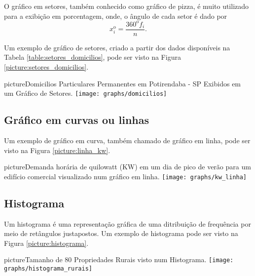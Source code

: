 \documentclass[11pt,fleqn]{book}
\numberwithin{mpicture}{chapter}
\numberwithin{mtable}{chapter}
\numberwithin{mframe}{chapter}
\begin{document}
O gráfico em setores, também conhecido como gráfico de pizza, é muito utilizado para a exibição em porcentagem, onde, o ângulo de cada setor é dado por
\[
	x_i^{\text{o}}=\frac{360^{\text{o}}f_i}{n}\text{.}
\]

Um exemplo de gráfico de setores, criado a partir dos dados disponíveis na Tabela \ref{table:setores_domicilios}, pode ser visto na Figura \ref{picture:setores_domicilios}.

\vspace{160pt}

\begin{pageWidthArea}
	\begin{pageWidthAreaPicture}{picture}{Domicilios Particulares Permanentes em Potirendaba - SP Exibidos em um Gráfico de Setores.}
		\label{picture:setores_domicilios}
		\centering
		\texttt{[image: graphs/domicilios]}
	\end{pageWidthAreaPicture}
\end{pageWidthArea}

\newpage

\subsection{Gráfico em curvas ou linhas}

Um exemplo de gráfico em curva, também chamado de gráfico em linha, pode ser visto na Figura \ref{picture:linha_kw}.

\begin{pageWidthArea}
	\begin{pageWidthAreaPicture}{picture}{Demanda horária de quilowatt (KW) em um dia de pico de verão para um edifício comercial visualizado num gráfico em linha.}
		\label{picture:linha_kw}
		\centering
		\texttt{[image: graphs/kw\_linha]}
	\end{pageWidthAreaPicture}
\end{pageWidthArea}

\subsection{Histograma}

Um histograma é uma representação gráfica de uma ditribuição de frequência por meio de retângulos justapostos. Um exemplo de histograma pode ser visto na Figura \ref{picture:histograma}.

\begin{pageWidthArea}
	\begin{pageWidthAreaPicture}{picture}{Tamanho de 80 Propriedades Rurais visto num Histograma.}
		\label{picture:histograma}
		\centering
		\texttt{[image: graphs/histograma\_rurais]}
	\end{pageWidthAreaPicture}
\end{pageWidthArea}
\end{document}
